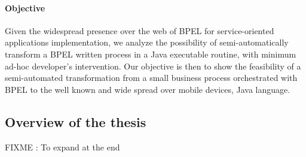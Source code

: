 \paragraph{Objective}
Given the widespread presence over the web of BPEL for service-oriented applications implementation, we analyze the possibility of semi-automatically transform a BPEL written process in a Java executable routine, with minimum ad-hoc developer's intervention.
Our objective is then to show the feasibility of a semi-automated transformation from a small business process orchestrated with BPEL to the well known and wide spread over mobile devices, Java language. 





\subsection{Overview of the thesis}
FIXME : To expand at the end



